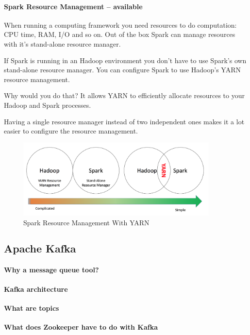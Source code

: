 \documentclass[12pt]{scrartcl} %
\begin{document}
\paragraph{Spark Resource Management -- available}
When running a computing framework you need resources to do computation: CPU time, RAM, I/O and so on. Out of the box Spark can manage resources with it’s stand-alone resource manager.

If Spark is running in an Hadoop environment you don’t have to use Spark’s own stand-alone resource manager. You can configure Spark to use Hadoop’s YARN resource management.

Why would you do that?
It allows YARN to efficiently allocate resources to your Hadoop and Spark processes.

Having a single resource manager instead of two independent ones makes it a lot easier to configure the resource management.

\begin{figure}[htbp] 
  \centering
     \includegraphics[width=0.9\textwidth]{images/Spark-Yarn}
  \caption{Spark Resource Management With YARN}
  \label{fig:Bild1}
\end{figure}


\subsection{Apache Kafka}

\paragraph{Why a message queue tool?}
\paragraph{Kafka architecture}
\paragraph{What are topics}
\paragraph{What does Zookeeper have to do with Kafka}
\end{document}
